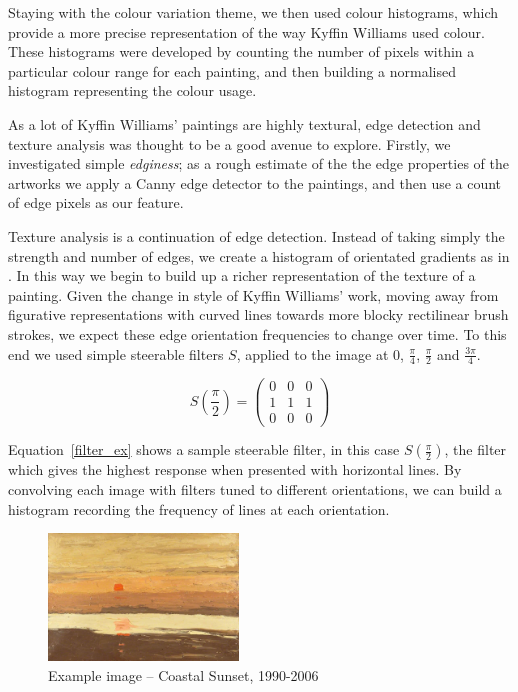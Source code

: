 \documentclass[conference,a4paper]{IEEEtran}
\begin{document}
Staying with the colour variation theme, we then used colour histograms, which
provide a more precise representation of the way Kyffin Williams used colour.
These histograms were developed by counting the number of pixels within a
particular colour range for each painting, and then building a normalised
histogram representing the colour usage. 

 
As a lot of Kyffin Williams' paintings are highly textural, edge detection and
texture analysis was thought to be a good avenue to explore.  Firstly, we
investigated simple \emph{edginess}; as a rough estimate of the the edge
properties of the artworks we apply a Canny \cite{Canny1986Computational} edge
detector to the paintings, and then use a count of edge pixels as our feature. 

Texture analysis is a continuation of edge detection. Instead of taking simply
the strength and number of edges, we create a histogram of orientated gradients
as in \cite{Dalal2005Histograms}. In this way we begin to build up a richer
representation of the texture of a painting. Given the change in style of
Kyffin Williams' work, moving away from figurative representations with curved
lines towards more blocky rectilinear brush strokes, we expect these edge
orientation frequencies to change over time. To this end we used simple
steerable filters $S$, applied to the image at $0$, $\frac{\pi}{4}$,
$\frac{\pi}{2}$ and $\frac{3\pi}{4}$. 

\begin{equation}
S\left(\frac{\pi}{2}\right) = \left( \begin{array}{ccc}
0 & 0 & 0 \\
1 & 1 & 1 \\
0 & 0 & 0 \end{array} \right)
\label{filter_ex}
\end{equation}

Equation~\ref{filter_ex} shows a sample steerable filter, in this case
$S(\frac{\pi}{2})$, the filter which gives the highest response when presented
with horizontal lines. By convolving each image with filters tuned to different
orientations, we can build a histogram recording the frequency of lines at each
orientation.

\begin{figure}[h]
\centering
\includegraphics[width=0.45\textwidth]{img/steerable.jpg}
\caption{Example image -- Coastal Sunset, 1990-2006}\label{fig:example-img}
\end{figure}
\end{document}
